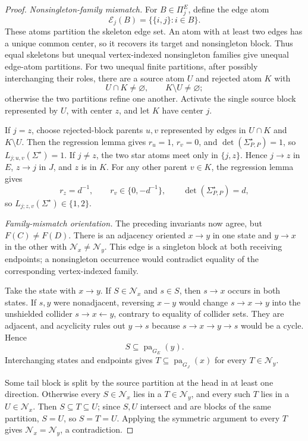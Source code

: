 \documentclass{article}
\begin{document}
\begin{proof}
\emph{Nonsingleton-family mismatch.}
For \(B\in\Pi^E_j\), define the edge atom
\[
 \mathscr E_j(B)=\{\{i,j\}:i\in B\}.
\]
These atoms partition the skeleton edge set.  An atom with at least two edges has a unique common center, so it recovers its target and nonsingleton block.  Thus equal skeletons but unequal vertex-indexed nonsingleton families give unequal edge-atom partitions.  For two unequal finite partitions, after possibly interchanging their roles, there are a source atom \(U\) and rejected atom \(K\) with
\[
 U\cap K\ne\varnothing,\qquad K\setminus U\ne\varnothing;
\]
otherwise the two partitions refine one another.  Activate the single source block represented by \(U\), with center \(z\), and let \(K\) have center \(j\).

If \(j=z\), choose rejected-block parents \(u,v\) represented by edges in \(U\cap K\) and \(K\setminus U\).  Then the regression lemma gives \(r_u=1\), \(r_v=0\), and \(\det(\Sigma^{\star}_{P,P})=1\), so \(L_{j;u,v}(\Sigma^{\star})=1\).  If \(j\ne z\), the two star atoms meet only in \(\{j,z\}\).  Hence \(j\to z\) in \(E\), \(z\to j\) in \(J\), and \(z\) is in \(K\).  For any other parent \(v\in K\), the regression lemma gives
\[
 r_z=d^{-1},\qquad r_v\in\{0,-d^{-1}\},\qquad
 \det(\Sigma^{\star}_{P,P})=d,
\]
so \(L_{j;z,v}(\Sigma^{\star})\in\{1,2\}\).

\emph{Family-mismatch orientation.}
The preceding invariants now agree, but \(F(C)\ne F(D)\).  There is an adjacency oriented \(x\to y\) in one state and \(y\to x\) in the other with \(\mathcal N_x\ne\mathcal N_y\).  This edge is a singleton block at both receiving endpoints; a nonsingleton occurrence would contradict equality of the corresponding vertex-indexed family.

Take the state with \(x\to y\).  If \(S\in\mathcal N_x\) and \(s\in S\), then \(s\to x\) occurs in both states.  If \(s,y\) were nonadjacent, reversing \(x-y\) would change \(s\to x\to y\) into the unshielded collider \(s\to x\leftarrow y\), contrary to equality of collider sets.  They are adjacent, and acyclicity rules out \(y\to s\) because \(s\to x\to y\to s\) would be a cycle.  Hence
\[
 S\subseteq\operatorname{pa}_{G_E}(y).
\]
Interchanging states and endpoints gives \(T\subseteq\operatorname{pa}_{G_J}(x)\) for every \(T\in\mathcal N_y\).

Some tail block is split by the source partition at the head in at least one direction.  Otherwise every \(S\in\mathcal N_x\) lies in a \(T\in\mathcal N_y\), and every such \(T\) lies in a \(U\in\mathcal N_x\).  Then \(S\subseteq T\subseteq U\); since \(S,U\) intersect and are blocks of the same partition, \(S=U\), so \(S=T=U\).  Applying the symmetric argument to every \(T\) gives \(\mathcal N_x=\mathcal N_y\), a contradiction.


\end{proof}
\end{document}
